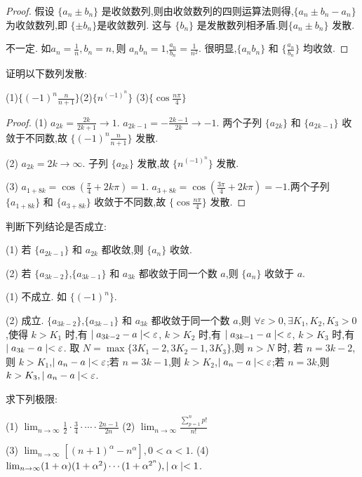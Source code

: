 \begin{proof}
    假设 $\{a_n\pm b_n\}$ 是收敛数列,则由收敛数列的四则运算法则得,$\{a_n\pm b_n - a_n\}$ 为收敛数列,即 $\{\pm b_n\}$是收敛数列. 这与 $\{b_n\}$ 是发散数列相矛盾.则$\{a_n\pm b_n\}$ 发散.

    不一定. 如$a_n=\frac{1}{n},b_n=n,$则 $a_nb_n=1$,$\frac{a_n}{b_n}=\frac{1}{n^2}.$ 很明显,$\{a_nb_n\}$ 和 $\{\frac{a_n}{b_n}\}$ 均收敛.
\end{proof}

\begin{practice}
    证明以下数列发散:

    (1)$\{(-1)^n\frac{n}{n+1}\}$\quad (2)$\{n^{(-1)^n}\}$ \quad (3)$\{\cos \frac{n\pi}{4}\}$
\end{practice}

\begin{proof}
    (1) $a_{2k}=\frac{2k}{2k+1}\to 1$. $a_{2k-1}=-\frac{2k-1}{2k}\to -1$. 两个子列 $\{a_{2k}\}$ 和 $\{a_{2k-1}\}$ 收敛于不同数,故 $\{(-1)^n\frac{n}{n+1}\}$ 发散.

    (2) $a_{2k}=2k\to \infty$. 子列 $\{a_{2k}\}$ 发散,故 $\{n^{(-1)^n}\}$ 发散.

    (3) $a_{1+8k}=\cos (\frac{\pi}{4}+2k\pi)=1$. $a_{3+8k}=\cos (\frac{3\pi}{4}+2k\pi)=-1$.两个子列 $\{a_{1+8k}\}$ 和 $\{a_{3+8k}\}$ 收敛于不同数,故 $\{\cos \frac{n\pi}{4}\}$ 发散.
\end{proof}

\begin{practice}
    判断下列结论是否成立:

    (1) 若 $\{a_{2k-1}\}$ 和 $a_{2k}$ 都收敛,则 $\{a_n\}$ 收敛.

    (2) 若 $\{a_{3k-2}\}$,$\{a_{3k-1}\}$ 和 $a_{3k}$ 都收敛于同一个数 $a$,则 $\{a_n\}$ 收敛于 $a$.
\end{practice}

\begin{solve}
    (1) 不成立. 如 $\{(-1)^n\}$.

    (2) 成立. $\{a_{3k-2}\}$,$\{a_{3k-1}\}$ 和 $a_{3k}$ 都收敛于同一个数 $a$,则 $\forall \varepsilon>0,\exists K_1,K_2,K_3>0$,使得 $ k>K_1$ 时,有 $\mid a_{3k-2}-a \mid<\varepsilon$, $ k>K_2$ 时,有 $\mid a_{3k-1}-a \mid<\varepsilon$, $ k>K_3$ 时,有 $\mid a_{3k}-a \mid<\varepsilon$. 取 $N=\max\{3K_1-2,3K_2-1,3K_3\}$,则 $n>N$ 时, 若 $n=3k-2$,则 $k>K_1$,$\mid a_n-a \mid<\varepsilon$;若 $n=3k-1$,则 $k>K_2$,$\mid a_n-a \mid<\varepsilon$;若 $n=3k$,则 $k>K_3,\mid a_n-a \mid<\varepsilon$.
\end{solve}

\begin{practice}
    求下列极限:

    (1) $\lim_{n\to\infty} \frac{1}{2}\cdot\frac{3}{4}\cdot \cdots \cdot \frac{2n-1}{2n}$ \qquad (2) $\lim_{n\to\infty} \frac{\sum\limits_{p=1}^{n}p!}{n!}$

    (3) $\lim_{n\to\infty} [(n+1)^\alpha-n^\alpha],0<\alpha<1$. \qquad (4) $\lim_{n\to\infty} (1+\alpha)(1+\alpha^2)\cdots(1+\alpha^{2^n}),\mid \alpha \mid<1$.
\end{practice}

